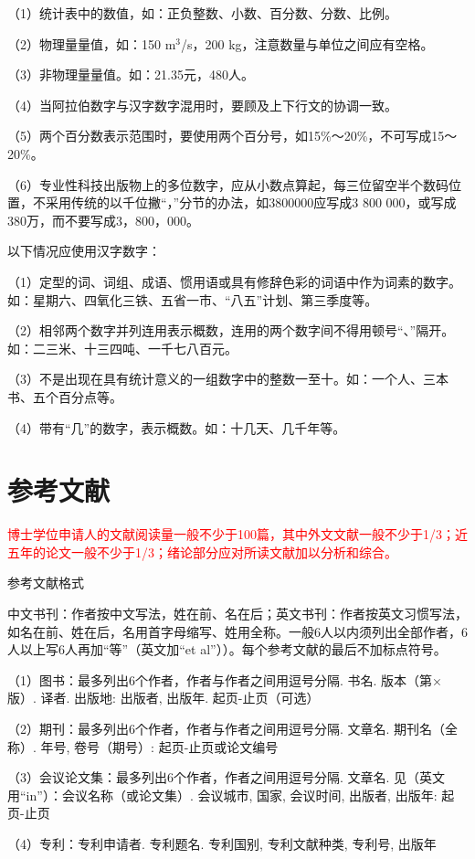 （1）统计表中的数值，如：正负整数、小数、百分数、分数、比例。 

（2）物理量量值，如：150 m$^3$/s，200 kg，注意数量与单位之间应有空格。

（3）非物理量量值。如：21.35元，480人。

（4）当阿拉伯数字与汉字数字混用时，要顾及上下行文的协调一致。

（5）两个百分数表示范围时，要使用两个百分号，如15\%～20\%，不可写成15～20\%。

（6）专业性科技出版物上的多位数字，应从小数点算起，每三位留空半个数码位置，不采用传统的以千位撇“，”分节的办法，如3800000应写成3 800 000，或写成380万，而不要写成3，800，000。

以下情况应使用汉字数字：

（1）定型的词、词组、成语、惯用语或具有修辞色彩的词语中作为词素的数字。如：星期六、四氧化三铁、五省一市、“八五”计划、第三季度等。

（2）相邻两个数字并列连用表示概数，连用的两个数字间不得用顿号“、”隔开。如：二三米、十三四吨、一千七八百元。

（3）不是出现在具有统计意义的一组数字中的整数一至十。如：一个人、三本书、五个百分点等。

（4）带有“几”的数字，表示概数。如：十几天、几千年等。

\section{参考文献}
\textcolor{red}{博士学位申请人的文献阅读量一般不少于100篇，其中外文文献一般不少于1/3；近五年的论文一般不少于1/3；绪论部分应对所读文献加以分析和综合。}

参考文献格式

中文书刊：作者按中文写法，姓在前、名在后；英文书刊：作者按英文习惯写法，如名在前、姓在后，名用首字母缩写、姓用全称。一般6人以内须列出全部作者，6人以上写6人再加“等”（英文加“et al”））。每个参考文献的最后不加标点符号。

（1）图书：最多列出6个作者，作者与作者之间用逗号分隔. 书名. 版本（第×版）. 译者. 出版地: 出版者, 出版年. 起页-止页（可选）

（2）期刊：最多列出6个作者，作者与作者之间用逗号分隔. 文章名. 期刊名（全称）. 年号, 卷号（期号）: 起页-止页或论文编号

（3）会议论文集：最多列出6个作者，作者之间用逗号分隔. 文章名. 见（英文用“in”）：会议名称（或论文集）. 会议城市, 国家, 会议时间, 出版者, 出版年: 起页-止页

（4）专利：专利申请者. 专利题名. 专利国别, 专利文献种类, 专利号, 出版年

